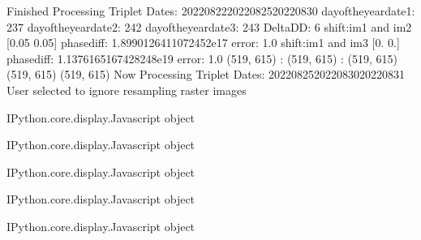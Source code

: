\documentclass[letterpaper,10pt]{sphinxmanual}
\begin{document}
\begin{sphinxVerbatim}[commandchars=\\\{\}]
Finished Processing Triplet Dates:  20220822\PYGZhy{}20220825\PYGZhy{}20220830
day\PYGZus{}of\PYGZus{}the\PYGZus{}year\PYGZus{}date1:  237
\PYGZhy{}\PYGZhy{}\PYGZhy{}\PYGZhy{}\PYGZhy{}\PYGZhy{}\PYGZhy{}\PYGZhy{}\PYGZhy{}\PYGZhy{}\PYGZhy{}\PYGZhy{}\PYGZhy{}\PYGZhy{}\PYGZhy{}\PYGZhy{}\PYGZhy{}\PYGZhy{}\PYGZhy{}\PYGZhy{}\PYGZhy{}
day\PYGZus{}of\PYGZus{}the\PYGZus{}year\PYGZus{}date2:  242
\PYGZhy{}\PYGZhy{}\PYGZhy{}\PYGZhy{}\PYGZhy{}\PYGZhy{}\PYGZhy{}\PYGZhy{}\PYGZhy{}\PYGZhy{}\PYGZhy{}\PYGZhy{}\PYGZhy{}\PYGZhy{}\PYGZhy{}\PYGZhy{}\PYGZhy{}\PYGZhy{}\PYGZhy{}\PYGZhy{}\PYGZhy{}
day\PYGZus{}of\PYGZus{}the\PYGZus{}year\PYGZus{}date3:  243
\PYGZhy{}\PYGZhy{}\PYGZhy{}\PYGZhy{}\PYGZhy{}\PYGZhy{}\PYGZhy{}\PYGZhy{}\PYGZhy{}\PYGZhy{}\PYGZhy{}\PYGZhy{}\PYGZhy{}\PYGZhy{}\PYGZhy{}\PYGZhy{}\PYGZhy{}\PYGZhy{}\PYGZhy{}\PYGZhy{}\PYGZhy{}
Delta\PYGZus{}DD: 6
shift:im1 and im2 [0.05 0.05] phasediff: \PYGZhy{}1.8990126411072452e\PYGZhy{}17 error: 1.0
shift:im1 and im3 [0. 0.] phasediff: 1.1376165167428248e\PYGZhy{}19 error: 1.0
(519, 615) :  (519, 615) :  (519, 615)
(519, 615)
(519, 615)
Now Processing Triplet Dates:  20220825\PYGZhy{}20220830\PYGZhy{}20220831
 User selected to ignore resampling raster images 



\PYGZlt{}IPython.core.display.Javascript object\PYGZgt{}
\end{sphinxVerbatim}



\begin{sphinxVerbatim}[commandchars=\\\{\}]
\PYGZlt{}IPython.core.display.Javascript object\PYGZgt{}
\end{sphinxVerbatim}



\begin{sphinxVerbatim}[commandchars=\\\{\}]
\PYGZlt{}IPython.core.display.Javascript object\PYGZgt{}
\end{sphinxVerbatim}



\begin{sphinxVerbatim}[commandchars=\\\{\}]
\PYGZlt{}IPython.core.display.Javascript object\PYGZgt{}
\end{sphinxVerbatim}



\begin{sphinxVerbatim}[commandchars=\\\{\}]
\PYGZlt{}IPython.core.display.Javascript object\PYGZgt{}
\end{sphinxVerbatim}
\end{document}
